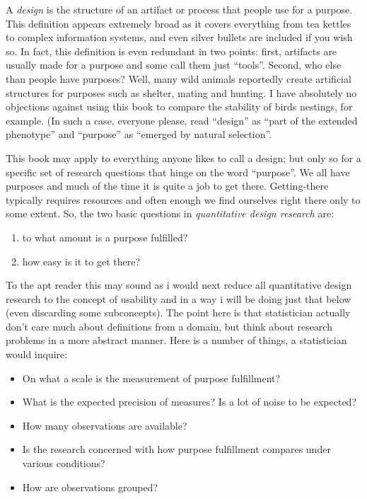 \documentclass[]{svmono}
\providecommand{\tightlist}{%
  \setlength{\itemsep}{0pt}\setlength{\parskip}{0pt}}
\theoremstyle{definition}
\theoremstyle{definition}
\theoremstyle{definition}
\theoremstyle{remark}
\begin{document}
A \emph{design} is the structure of an artifact or process that people
use for a purpose. This definition appears extremely broad as it covers
everything from tea kettles to complex information systems, and even
silver bullets are included if you wish so. In fact, this definition is
even redundant in two points: first, artifacts are usually made for a
purpose and some call them just ``tools''. Second, who else than people
have purposes? Well, many wild animals reportedly create artificial
structures for purposes such as shelter, mating and hunting. I have
absolutely no objections against using this book to compare the
stability of birds nestings, for example. (In such a case, everyone
please, read ``design'' as ``part of the extended phenotype'' and
``purpose'' as ``emerged by natural selection''.

This book may apply to everything anyone likes to call a design; but
only so for a specific set of research questions that hinge on the word
``purpose''. We all have purposes and much of the time it is quite a job
to get there. Getting-there typically requires resources and often
enough we find ourselves right there only to some extent. So, the two
basic questions in \emph{quantitative design research} are:

\begin{enumerate}
\def\labelenumi{\arabic{enumi}.}
\tightlist
\item
  to what amount is a purpose fulfilled?
\item
  how easy is it to get there?
\end{enumerate}

To the apt reader this may sound as i would next reduce all quantitative
design research to the concept of usability and in a way i will be doing
just that below (even discarding some subconcepts). The point here is
that statistician actually don't care much about definitions from a
domain, but think about research problems in a more abstract manner.
Here is a number of things, a statistician would inquire:

\begin{itemize}
\tightlist
\item
  On what a scale is the measurement of purpose fulfillment?
\item
  What is the expected precision of measures? Is a lot of noise to be
  expected?
\item
  How many observations are available?
\item
  Is the research concerned with how purpose fulfillment compares under
  various conditions?
\item
  How are observations grouped?
\end{itemize}
\end{document}
